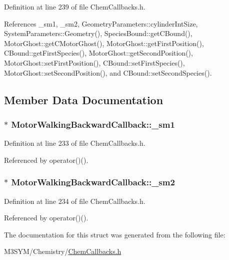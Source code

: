 Definition at line 239 of file Chem\+Callbacks.\+h.



References \+\_\+sm1, \+\_\+sm2, Geometry\+Parameters\+::cylinder\+Int\+Size, System\+Parameters\+::\+Geometry(), Species\+Bound\+::get\+C\+Bound(), Motor\+Ghost\+::get\+C\+Motor\+Ghost(), Motor\+Ghost\+::get\+First\+Position(), C\+Bound\+::get\+First\+Species(), Motor\+Ghost\+::get\+Second\+Position(), Motor\+Ghost\+::set\+First\+Position(), C\+Bound\+::set\+First\+Species(), Motor\+Ghost\+::set\+Second\+Position(), and C\+Bound\+::set\+Second\+Species().



\subsection{Member Data Documentation}
\hypertarget{structMotorWalkingBackwardCallback_a319a8ea51cf864c8dddeafeb6356af34}{
\subsubsection[{\+\_\+sm1}]{$\ast$ Motor\+Walking\+Backward\+Callback\+::\+\_\+sm1}}\label{structMotorWalkingBackwardCallback_a319a8ea51cf864c8dddeafeb6356af34}


Definition at line 233 of file Chem\+Callbacks.\+h.



Referenced by operator()().

\hypertarget{structMotorWalkingBackwardCallback_ac19bf18556502e7eda1b89d28b36236e}{
\subsubsection[{\+\_\+sm2}]{$\ast$ Motor\+Walking\+Backward\+Callback\+::\+\_\+sm2}}\label{structMotorWalkingBackwardCallback_ac19bf18556502e7eda1b89d28b36236e}


Definition at line 234 of file Chem\+Callbacks.\+h.



Referenced by operator()().



The documentation for this struct was generated from the following file\+:\begin{DoxyCompactItemize}
\item 
M3\+S\+Y\+M/\+Chemistry/\hyperlink{ChemCallbacks_8h}{Chem\+Callbacks.\+h}\end{DoxyCompactItemize}
